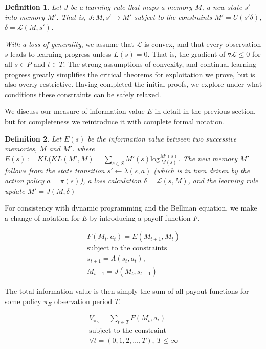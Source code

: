 \documentclass[9pt,twocolumn,twoside]{pnas-new}
\newtheorem{definition}{Definition}
\begin{document}
\begin{definition}
    Let $J$ be a learning rule that maps a memory $M$, a new state $s'$ into memory $M'$. That is, $J : M, s' \rightarrow M'$ subject to the constraints  $M' = U(s' \delta)$, $\delta = \mathcal{L}(M, s')$.
\end{definition}

\textit{With a loss of generality}, we assume that $\mathcal{L}$ is convex, and that every observation $s$ leads to learning progress unless $L(s) = 0$. That is, the gradient of $\triangledown \mathcal{L} \leq 0$ for all $s \in P$ and $t \in T$. The strong assumptions of convexity, and continual learning progress greatly simplifies the critical theorems for exploitation we prove, but is also overly restrictive. Having completed the initial proofs, we explore under what conditions these constraints can be safely relaxed.

We discuss our measure of information value $E$ in detail in the previous section, but for completeness we reintroduce it with complete formal notation.

\begin{definition}
    Let $E(s)$ be the information value between two successive memories, $M$ and $M'$. where $E(s) := KL(KL(M', M) = \sum_{s \in S} M'(s) \text{log} \frac{M'(s)}{M(s)} $. The new memory $M'$ follows from the state transition $s' \leftarrow \lambda (s, a)$ (which is in turn driven by the action policy $a = \pi(s)$), a loss calculation $\delta = \mathcal{L}(s, M)$, and the learning rule update $M' = J(M, \delta)$
\end{definition}

For consistency with dynamic programming and the Bellman equation, we make a change of notation for $E$ by introducing a payoff function $F$.

\begin{equation}
    \begin{split} \label{eq:V}
    F(M_t, a_t) = E(M_{t+1}, M_{t})\\
    \text{subject to the constraints} \\
    s_{t+1} = \Lambda(s_t, a_t),\\ 
    M_{t+1} = J(M_t, s_{t+1})
    \end{split} 
\end{equation}

The total information value is then simply the sum of all payout functions for some policy $\pi_E$ observation period $T$. 

\begin{equation} \label{eq:V}
    \begin{split}
        V_{\pi_E} = \sum_{t \in T} F(M_t, a_t)\\
        \text{subject to the constraint}\\
        \forall t = (0,1,2,\ldots, T),\ T \leq \infty
    \end{split}
\end{equation}
\end{document}
